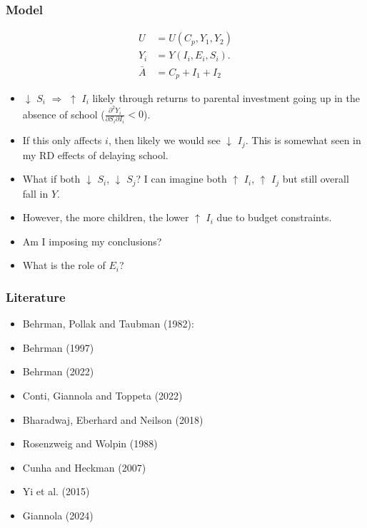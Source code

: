 \documentclass{beamer}
\begin{document}
\begin{frame}
    \label{update_scott}
    \frametitle{Model}
        \begin{equation}
        \begin{aligned}
        U &= U(C_p, Y_1, Y_2) \\
        Y_i &= Y(I_i, E_i, S_i). \\
        \bar{A} &= C_p + I_1 + I_2
        \end{aligned}
        \tag{1}
        \end{equation}

\begin{itemize}
  \item $\downarrow$ $S_i$ $\Rightarrow$ $\uparrow$ $I_i$ likely through returns to parental investment going up in the absence of school ($\frac{\partial^2 Y_i}{\partial S_i \partial I_i}<0$). 
   
  \item If this only affects $i$, then likely we would see $\downarrow$ $I_j$. This is somewhat seen in my RD effects of delaying school.

  \item What if both $\downarrow$ $S_i$,  $\downarrow$ $S_j$? I can imagine both $\uparrow$ $I_i$, $\uparrow$ $I_j$ but still overall fall in $Y$.

  \item However, the more children, the lower $\uparrow$ $I_i$ due to budget constraints.

  \item Am I imposing my conclusions?

  \item What is the role of $E_i$?
\end{itemize}
   
\end{frame}


\begin{frame}
    \label{update_scott}
    \frametitle{Literature}
      \begin{itemize}
    \item  Behrman, Pollak and Taubman (1982):
    \item  Behrman (1997)
    \item  Behrman (2022)
    \item  Conti, Giannola and Toppeta (2022)
    \item  Bharadwaj, Eberhard and Neilson (2018)
    \item  Rosenzweig and Wolpin (1988)
    \item  Cunha and Heckman (2007)
    \item  Yi et al. (2015)
    \item  Giannola (2024)
    \end{itemize}
\end{frame}
\end{document}

